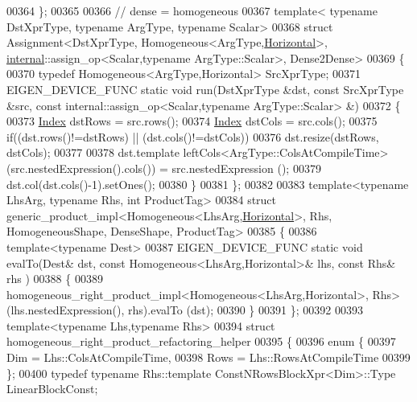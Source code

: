 \begin{DoxyCode}
00364 \};
00365 
00366 \textcolor{comment}{// dense = homogeneous}
00367 \textcolor{keyword}{template}< \textcolor{keyword}{typename} DstXprType, \textcolor{keyword}{typename} ArgType, \textcolor{keyword}{typename} Scalar>
00368 \textcolor{keyword}{struct }Assignment<DstXprType, Homogeneous<ArgType,\hyperlink{group__enums_ggad49a7b3738e273eb00932271b36127f7aae8a16b3b9272683c1162915f6d892be}{Horizontal}>, 
      \hyperlink{namespaceinternal}{internal}::assign\_op<Scalar,typename ArgType::Scalar>, Dense2Dense>
00369 \{
00370   \textcolor{keyword}{typedef} Homogeneous<ArgType,Horizontal> SrcXprType;
00371   EIGEN\_DEVICE\_FUNC \textcolor{keyword}{static} \textcolor{keywordtype}{void} run(DstXprType &dst, \textcolor{keyword}{const} SrcXprType &src, \textcolor{keyword}{const} 
      internal::assign\_op<Scalar,typename ArgType::Scalar> &)
00372   \{
00373     \hyperlink{namespace_eigen_a62e77e0933482dafde8fe197d9a2cfde}{Index} dstRows = src.rows();
00374     \hyperlink{namespace_eigen_a62e77e0933482dafde8fe197d9a2cfde}{Index} dstCols = src.cols();
00375     \textcolor{keywordflow}{if}((dst.rows()!=dstRows) || (dst.cols()!=dstCols))
00376       dst.resize(dstRows, dstCols);
00377 
00378     dst.template leftCols<ArgType::ColsAtCompileTime>(src.nestedExpression().cols()) = src.nestedExpression
      ();
00379     dst.col(dst.cols()-1).setOnes();
00380   \}
00381 \};
00382 
00383 \textcolor{keyword}{template}<\textcolor{keyword}{typename} LhsArg, \textcolor{keyword}{typename} Rhs, \textcolor{keywordtype}{int} ProductTag>
00384 \textcolor{keyword}{struct }generic\_product\_impl<Homogeneous<LhsArg,\hyperlink{group__enums_ggad49a7b3738e273eb00932271b36127f7aae8a16b3b9272683c1162915f6d892be}{Horizontal}>, Rhs, HomogeneousShape, DenseShape, 
      ProductTag>
00385 \{
00386   \textcolor{keyword}{template}<\textcolor{keyword}{typename} Dest>
00387   EIGEN\_DEVICE\_FUNC \textcolor{keyword}{static} \textcolor{keywordtype}{void} evalTo(Dest& dst, \textcolor{keyword}{const} Homogeneous<LhsArg,Horizontal>& lhs, \textcolor{keyword}{const} Rhs& rhs
      )
00388   \{
00389     homogeneous\_right\_product\_impl<Homogeneous<LhsArg,Horizontal>, Rhs>(lhs.nestedExpression(), rhs).evalTo
      (dst);
00390   \}
00391 \};
00392 
00393 \textcolor{keyword}{template}<\textcolor{keyword}{typename} Lhs,\textcolor{keyword}{typename} Rhs>
00394 \textcolor{keyword}{struct }homogeneous\_right\_product\_refactoring\_helper
00395 \{
00396   \textcolor{keyword}{enum} \{
00397     Dim  = Lhs::ColsAtCompileTime,
00398     Rows = Lhs::RowsAtCompileTime
00399   \};
00400   \textcolor{keyword}{typedef} \textcolor{keyword}{typename} Rhs::template ConstNRowsBlockXpr<Dim>::Type          LinearBlockConst;

\end{DoxyCode}
